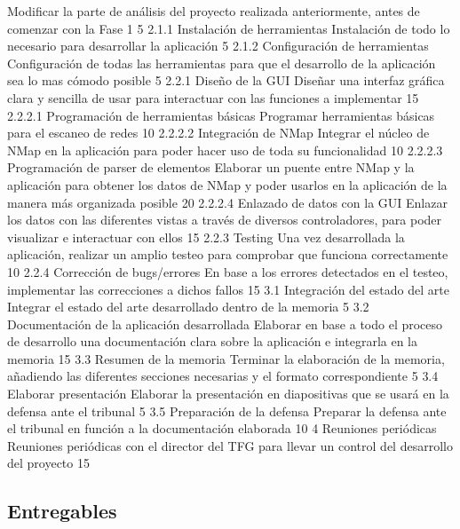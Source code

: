	{Modificar la parte de análisis del proyecto realizada anteriormente, antes de comenzar con la Fase 1}
	{5}					
\taskframe
	{2.1.1}
	{Instalación de herramientas}
	{Instalación de todo lo necesario para desarrollar la aplicación}
	{5}
\taskframe
	{2.1.2}
	{Configuración de herramientas}
	{Configuración de todas las herramientas para que el desarrollo de la aplicación sea lo mas cómodo posible}
	{5}
\taskframe
	{2.2.1}
	{Diseño de la GUI}
	{Diseñar una interfaz gráfica clara y sencilla de usar para interactuar con las funciones a implementar}
	{15}
\taskframe
	{2.2.2.1}
	{Programación de herramientas básicas}
	{Programar herramientas básicas para el escaneo de redes}
	{10}
\taskframe
	{2.2.2.2}
	{Integración de NMap}
	{Integrar el núcleo de NMap en la aplicación para poder hacer uso de toda su funcionalidad}
	{10}
\taskframe
	{2.2.2.3}
	{Programación de parser de elementos}
	{Elaborar un puente entre NMap y la aplicación para obtener los datos de NMap y poder usarlos en la aplicación de la manera más organizada posible}
	{20}
\taskframe
	{2.2.2.4}
	{Enlazado de datos con la GUI}
	{Enlazar los datos con las diferentes vistas a través de diversos controladores, para poder visualizar e interactuar con ellos}
	{15}
\taskframe
	{2.2.3}
	{Testing}
	{Una vez desarrollada la aplicación, realizar un amplio testeo para comprobar que funciona correctamente}
	{10}
\taskframe
	{2.2.4}
	{Corrección de bugs/errores}
	{En base a los errores detectados en el testeo, implementar las correcciones a dichos fallos}
	{15}
\taskframe
	{3.1}
	{Integración del estado del arte}
	{Integrar el estado del arte desarrollado dentro de la memoria}
	{5}
\taskframe
	{3.2}
	{Documentación de la aplicación desarrollada}
	{Elaborar en base a todo el proceso de desarrollo una documentación clara sobre la aplicación e integrarla en la memoria}
	{15}
\taskframe
	{3.3}
	{Resumen de la memoria}
	{Terminar la elaboración de la memoria, añadiendo las diferentes secciones necesarias y el formato correspondiente}
	{5}
\taskframe
	{3.4}
	{Elaborar presentación}
	{Elaborar la presentación en diapositivas que se usará en la defensa ante el tribunal}
	{5}
\taskframe
	{3.5}
	{Preparación de la defensa}
	{Preparar la defensa ante el tribunal en función a la documentación elaborada}
	{10}
\taskframe
	{4}
	{Reuniones periódicas}
	{Reuniones periódicas con el director del TFG para llevar un control del desarrollo del proyecto}
	{15}

\subsection{Entregables}


